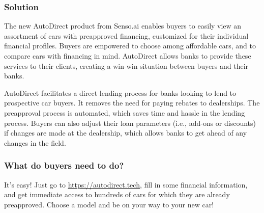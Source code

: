 \documentclass[fontsize=14pt]{article}
\begin{document}

\subsubsection*{\large Solution}

The new AutoDirect product from Senso.ai enables buyers to easily view an assortment of cars with preapproved financing, customized for their individual financial profiles. Buyers are empowered to choose among affordable cars, and to compare cars with financing in mind. AutoDirect allows banks to provide these services to their clients, creating a win-win situation between buyers and their banks.

\smallskip

\noindent
AutoDirect facilitates a direct lending process for banks looking to lend to prospective car buyers. It removes the need for paying rebates to dealerships. The preapproval process is automated, which saves time and hassle in the lending process. Buyers can also adjust their loan parameters (i.e., add-ons or discounts) if changes are made at the dealership, which allows banks to get ahead of any changes in the field. 

    

\subsubsection*{\large What do buyers need to do?}

It's easy! Just go to {\color{blue} \href{https://autodirect.tech}{https://autodirect.tech}}, fill in some financial information, and get immediate access to hundreds of cars for which they are already preapproved. Choose a model and be on your way to your new car!
\end{document}
